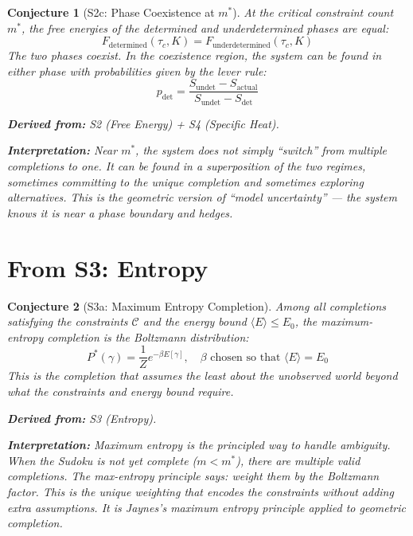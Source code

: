 \documentclass[11pt,letterpaper]{article}
\newtheorem{conjecture}{Conjecture}[section]
\begin{document}
\begin{conjecture}[S2c: Phase Coexistence at 
$m^*$]\label{conj:coexistence}
At the critical constraint count $m^*$, the free energies of the 
determined and underdetermined phases are equal:
\begin{equation}
    F_{\mathrm{determined}}(\tau_c, K) 
    = F_{\mathrm{underdetermined}}(\tau_c, K)
\end{equation}
The two phases coexist. In the coexistence region, the system can be found 
in either phase with probabilities given by the lever rule:
\begin{equation}
    p_{\mathrm{det}} = \frac{S_{\mathrm{undet}} - S_{\mathrm{actual}}}
    {S_{\mathrm{undet}} - S_{\mathrm{det}}}
\end{equation}

\textbf{Derived from:} S2 (Free Energy) + S4 (Specific Heat).

\textbf{Interpretation:} Near $m^*$, the system does not simply ``switch'' 
from multiple completions to one. It can be found in a superposition of 
the two regimes, sometimes committing to the unique completion and 
sometimes exploring alternatives. This is the geometric version of 
``model uncertainty'' --- the system knows it is near a phase boundary 
and hedges.
\end{conjecture}

\newpage
\section{From S3: Entropy}

\begin{conjecture}[S3a: Maximum Entropy Completion]\label{conj:maxent}
Among all completions satisfying the constraints $\mathcal{C}$ and the 
energy bound $\langle E \rangle \leq E_0$, the maximum-entropy completion 
is the Boltzmann distribution:
\begin{equation}
    P^*(\gamma) = \frac{1}{Z} e^{-\beta E[\gamma]}, \quad 
    \beta \text{ chosen so that } \langle E \rangle = E_0
\end{equation}
This is the completion that assumes the least about the unobserved world 
beyond what the constraints and energy bound require.

\textbf{Derived from:} S3 (Entropy).

\textbf{Interpretation:} Maximum entropy is the principled way to handle 
ambiguity. When the Sudoku is not yet complete ($m < m^*$), there are 
multiple valid completions. The max-entropy principle says: weight them 
by the Boltzmann factor. This is the unique weighting that encodes the 
constraints without adding extra assumptions. It is Jaynes's maximum 
entropy principle applied to geometric completion.
\end{conjecture}
\end{document}
